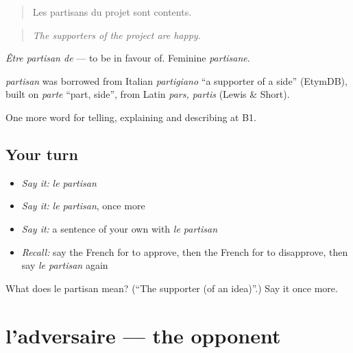 \begin{quote}
Les partisans du projet sont contents.
\end{quote}

\begin{quote}
\emph{The supporters of the project are happy.}
\end{quote}

\emph{Être partisan de} — to be in favour of. Feminine \emph{partisane}.

\begin{cousinweb}
\emph{partisan} was borrowed from Italian \emph{partigiano} \textquotedblleft{}a supporter of a side\textquotedblright{} (EtymDB), built on \emph{parte} \textquotedblleft{}part, side\textquotedblright{}, from Latin \emph{pars, partis} (Lewis \& Short).
\end{cousinweb}

\begin{grammarlens}[title={What you've built}]
One more word for telling, explaining and describing at B1.
\end{grammarlens}

\subsection*{Your turn}
\begin{itemize}
\raggedright
  \item \emph{Say it:} \emph{le partisan}
  \item \emph{Say it:} \emph{le partisan}, once more
  \item \emph{Say it:} a sentence of your own with \emph{le partisan}
  \item \emph{Recall:} say the French for to approve, then the French for to disapprove, then say \emph{le partisan} again
\end{itemize}

\begin{tcolorbox}[breakable,colback=teal!4,colframe=teal!35!black,title={Before you move on}]
What does le partisan mean? (\textquotedblleft{}The supporter (of an idea)\textquotedblright{}.) Say it once more.
\end{tcolorbox}
\section[l'adversaire]{l'adversaire — the opponent}

\label{lesson:FR-C345-adversaire}



